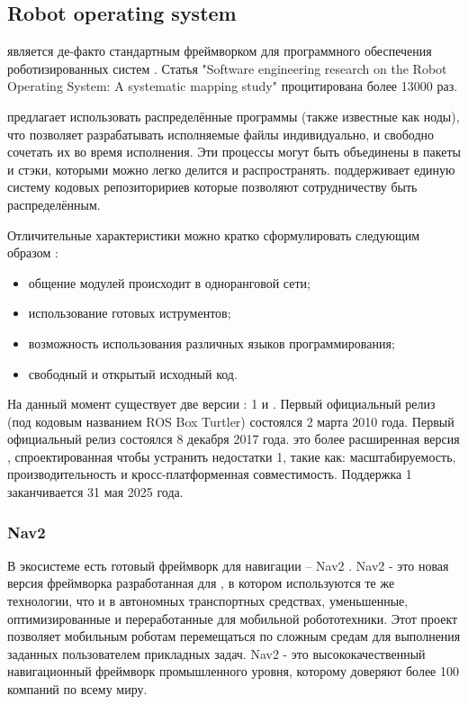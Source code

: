 \subsection{Robot operating system}
\ros{} является де-факто стандартным фреймворком для программного обеспечения
роботизированных систем \cite{albonico2023software}. Статья
"Software engineering research on the Robot Operating System: A systematic
mapping study"
\cite{quigley2009ros} процитирована более \num{13000} раз.

\ros{} предлагает использовать распределённые программы (также известные как
ноды), что позволяет разрабатывать исполняемые файлы индивидуально, и свободно
сочетать их во время исполнения. Эти процессы могут быть объединены в пакеты и
стэки, которыми можно легко делится и распространять.
\ros{} поддерживает единую систему кодовых репозиторириев которые
позволяют сотрудничеству быть распределённым.

Отличительные характеристики \ros{} можно кратко сформулировать следующим образом
 \cite{quigley2009ros}:
\begin{itemize}
	\item общение модулей происходит в одноранговой сети;
	\item использование готовых иструментов;
	\item возможность использования различных языков программирования;
	\item свободный и открытый исходный код.
\end{itemize}

На данный момент существует две версии \ros{}: \ros{}1 и \rosTwo{}. Первый
официальный релиз \ros{} (под кодовым названием ROS Box Turtler) состоялся 2
марта 2010 года. Первый официальный релиз \rosTwo{} состоялся 8 декабря 2017
года. \rosTwo{} это более расширенная версия \ros{}, спроектированная чтобы
устранить недостатки \ros{} 1, такие как: масштабируемость, производительность и
кросс-платформенная совместимость. Поддержка \ros{} 1 заканчивается 31 мая 2025
года. 


\subsubsection{Nav2}
В экосистеме \ros{} есть готовый фреймворк для навигации -- Nav2
\cite{macenski2020marathon2}. Nav2 - это новая версия фреймворка
разработанная для \rosTwo{}, в котором используются те же технологии, что и в
автономных транспортных средствах, уменьшенные, оптимизированные и
переработанные для мобильной робототехники. Этот проект позволяет мобильным
роботам перемещаться по сложным средам для выполнения заданных пользователем
прикладных задач. Nav2 - это высококачественный навигационный фреймворк
промышленного уровня, которому доверяют более 100 компаний по всему миру.

